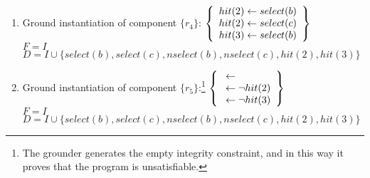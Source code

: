 \begin{Loesung}
\begin{UList}
\begin{description}
{\begin{enumerate}
  \item Ground instantiation of component $\{r_4\}$:
  \( \left\{
  \begin{array}{r@{}c@{}l}
    hit(2) & {} \leftarrow {} & select(b)\\
    hit(2) & {} \leftarrow {} & select(c)\\
    hit(3) & {} \leftarrow {} & select(b)
  \end{array}
  \right\}
  \)
  \\
  $F = I$ 
  \\ 
  $D = I \cup \{ select(b), select(c), nselect(b), nselect(c), hit(2), hit(3) \}$
  \item Ground instantiation of component $\{r_5\}$:\footnote{%
  The grounder generates the empty integrity constraint, 
  and in this way it proves that the program is unsatisfiable.}
  \( \left\{
  \begin{array}{r@{}c@{}l}
    & {} \leftarrow {} & \\
    & {} \leftarrow {} & \naf{hit(2)}\\
    & {} \leftarrow {} & \naf{hit(3)}\\
  \end{array}
  \right\}
  \)
  \\
  $F = I$ 
  \\ 
  $D = I \cup \{ select(b), select(c), nselect(b), nselect(c), hit(2), hit(3) \}$
\end{enumerate}
}
%
\end{description}
%
\item 
{}
\end{UList}
\end{Loesung}

